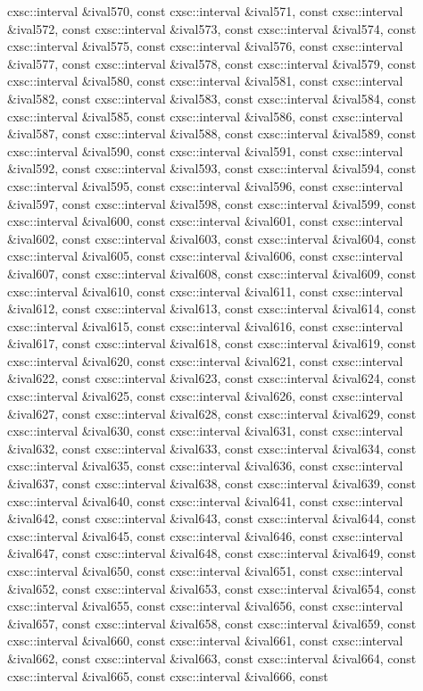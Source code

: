 \begin{DoxyCompactItemize}
cxsc\-::interval \&ival570, const cxsc\-::interval \&ival571, const cxsc\-::interval \&ival572, const cxsc\-::interval \&ival573, const cxsc\-::interval \&ival574, const cxsc\-::interval \&ival575, const cxsc\-::interval \&ival576, const cxsc\-::interval \&ival577, const cxsc\-::interval \&ival578, const cxsc\-::interval \&ival579, const cxsc\-::interval \&ival580, const cxsc\-::interval \&ival581, const cxsc\-::interval \&ival582, const cxsc\-::interval \&ival583, const cxsc\-::interval \&ival584, const cxsc\-::interval \&ival585, const cxsc\-::interval \&ival586, const cxsc\-::interval \&ival587, const cxsc\-::interval \&ival588, const cxsc\-::interval \&ival589, const cxsc\-::interval \&ival590, const cxsc\-::interval \&ival591, const cxsc\-::interval \&ival592, const cxsc\-::interval \&ival593, const cxsc\-::interval \&ival594, const cxsc\-::interval \&ival595, const cxsc\-::interval \&ival596, const cxsc\-::interval \&ival597, const cxsc\-::interval \&ival598, const cxsc\-::interval \&ival599, const cxsc\-::interval \&ival600, const cxsc\-::interval \&ival601, const cxsc\-::interval \&ival602, const cxsc\-::interval \&ival603, const cxsc\-::interval \&ival604, const cxsc\-::interval \&ival605, const cxsc\-::interval \&ival606, const cxsc\-::interval \&ival607, const cxsc\-::interval \&ival608, const cxsc\-::interval \&ival609, const cxsc\-::interval \&ival610, const cxsc\-::interval \&ival611, const cxsc\-::interval \&ival612, const cxsc\-::interval \&ival613, const cxsc\-::interval \&ival614, const cxsc\-::interval \&ival615, const cxsc\-::interval \&ival616, const cxsc\-::interval \&ival617, const cxsc\-::interval \&ival618, const cxsc\-::interval \&ival619, const cxsc\-::interval \&ival620, const cxsc\-::interval \&ival621, const cxsc\-::interval \&ival622, const cxsc\-::interval \&ival623, const cxsc\-::interval \&ival624, const cxsc\-::interval \&ival625, const cxsc\-::interval \&ival626, const cxsc\-::interval \&ival627, const cxsc\-::interval \&ival628, const cxsc\-::interval \&ival629, const cxsc\-::interval \&ival630, const cxsc\-::interval \&ival631, const cxsc\-::interval \&ival632, const cxsc\-::interval \&ival633, const cxsc\-::interval \&ival634, const cxsc\-::interval \&ival635, const cxsc\-::interval \&ival636, const cxsc\-::interval \&ival637, const cxsc\-::interval \&ival638, const cxsc\-::interval \&ival639, const cxsc\-::interval \&ival640, const cxsc\-::interval \&ival641, const cxsc\-::interval \&ival642, const cxsc\-::interval \&ival643, const cxsc\-::interval \&ival644, const cxsc\-::interval \&ival645, const cxsc\-::interval \&ival646, const cxsc\-::interval \&ival647, const cxsc\-::interval \&ival648, const cxsc\-::interval \&ival649, const cxsc\-::interval \&ival650, const cxsc\-::interval \&ival651, const cxsc\-::interval \&ival652, const cxsc\-::interval \&ival653, const cxsc\-::interval \&ival654, const cxsc\-::interval \&ival655, const cxsc\-::interval \&ival656, const cxsc\-::interval \&ival657, const cxsc\-::interval \&ival658, const cxsc\-::interval \&ival659, const cxsc\-::interval \&ival660, const cxsc\-::interval \&ival661, const cxsc\-::interval \&ival662, const cxsc\-::interval \&ival663, const cxsc\-::interval \&ival664, const cxsc\-::interval \&ival665, const cxsc\-::interval \&ival666, const 
\end{DoxyCompactItemize}
